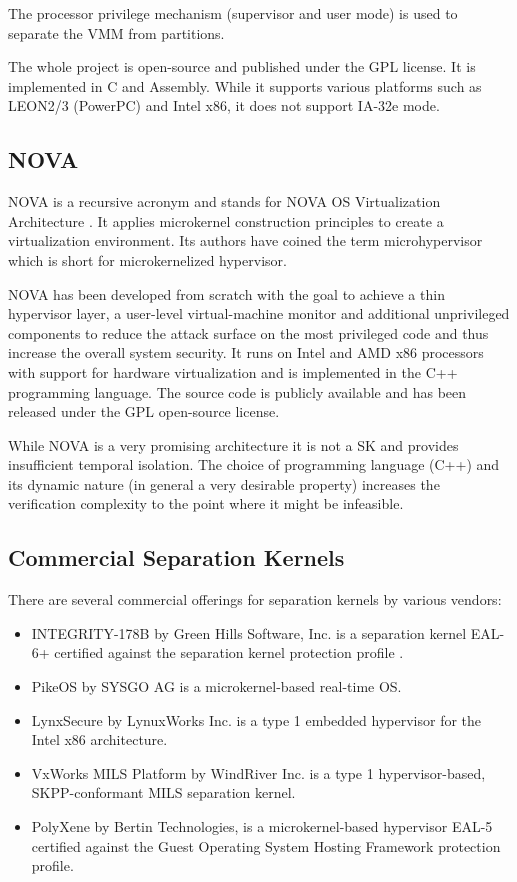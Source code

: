 The processor privilege mechanism (supervisor and user mode) is used to
separate the VMM from partitions.

The whole project is open-source and published under the GPL license. It is
implemented in C and Assembly. While it supports various platforms such as
LEON2/3 (PowerPC) and Intel x86, it does not support IA-32e mode.

\subsection{NOVA}
NOVA is a recursive acronym and stands for NOVA OS Virtualization Architecture
\cite{Steinberg:2010:NMS:1755913.1755935}. It applies microkernel construction
principles to create a virtualization environment. Its authors have coined
the term microhypervisor which is short for
microkernelized hypervisor.

NOVA has been developed from scratch with the goal to achieve a thin hypervisor
layer, a user-level virtual-machine monitor and additional unprivileged
components to reduce the attack surface on the most privileged code and thus
increase the overall system security. It runs on Intel and AMD x86 processors
with support for hardware virtualization and is implemented in the C++
programming language. The source code is publicly available \cite{NOVA} and has
been released under the GPL open-source license.

While NOVA is a very promising architecture it is not a SK and provides
insufficient temporal isolation. The choice of programming language (C++) and
its dynamic nature (in general a very desirable property) increases the
verification complexity to the point where it might be infeasible.

\subsection{Commercial Separation Kernels}\label{subsec:commercial-sks}
There are several commercial offerings for separation kernels by various
vendors:

\begin{itemize}
	\item INTEGRITY-178B by Green Hills Software, Inc. is a separation kernel
		EAL-6+ certified against the separation kernel protection profile
		\cite{SKPP}.
	\item PikeOS by SYSGO AG is a microkernel-based real-time OS.
	\item LynxSecure by LynuxWorks Inc. is a type 1 embedded hypervisor for the
		Intel x86 architecture.
	\item VxWorks MILS Platform by WindRiver Inc. is a type 1 hypervisor-based,
		SKPP-con\-for\-mant MILS separation kernel.
	\item PolyXene by Bertin Technologies, is a microkernel-based hypervisor
		EAL-5 certified against the Guest Operating System Hosting Framework
		protection profile.
\end{itemize}

